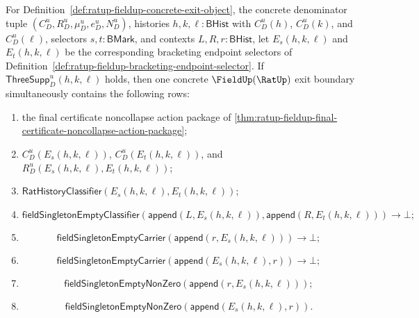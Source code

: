 \begin{theorem}
\label{thm:ratup-fieldup-final-certificate-selector-noncollapse-boundary}
For Definition~\ref{def:ratup-fieldup-concrete-exit-object}, the concrete
denominator tuple $(C_D^u,R_D^u,\mu_D^u,e_D^u,N_D^u)$, histories
$h,k,\ell:\mathsf{BHist}$ with $C_D^u(h)$, $C_D^u(k)$, and $C_D^u(\ell)$,
selectors $s,t:\mathsf{BMark}$, and contexts $L,R,r:\mathsf{BHist}$, let
$E_s(h,k,\ell)$ and $E_t(h,k,\ell)$ be the corresponding bracketing endpoint
selectors of Definition~\ref{def:ratup-fieldup-bracketing-endpoint-selector}. If
$\mathsf{ThreeSupp}_D^u(h,k,\ell)$ holds, then one concrete
$\FieldUp(\RatUp)$ exit boundary simultaneously contains the following rows:
\begin{enumerate}
  \item the final certificate noncollapse action package of
  \autoref{thm:ratup-fieldup-final-certificate-noncollapse-action-package};
  \item $C_D^u(E_s(h,k,\ell))$, $C_D^u(E_t(h,k,\ell))$, and
  $R_D^u(E_s(h,k,\ell),E_t(h,k,\ell))$;
  \item $\mathsf{RatHistoryClassifier}(E_s(h,k,\ell),E_t(h,k,\ell))$;
  \item
  $$
  \mathsf{fieldSingletonEmptyClassifier}
  (\mathsf{append}(L,E_s(h,k,\ell)),\mathsf{append}(R,E_t(h,k,\ell)))\to\bot;
  $$
  \item
  $$
  \mathsf{fieldSingletonEmptyCarrier}(\mathsf{append}(r,E_s(h,k,\ell)))\to\bot;
  $$
  \item
  $$
  \mathsf{fieldSingletonEmptyCarrier}(\mathsf{append}(E_s(h,k,\ell),r))\to\bot;
  $$
  \item
  $$
  \mathsf{fieldSingletonEmptyNonZero}(\mathsf{append}(r,E_s(h,k,\ell)));
  $$
  \item
  $$
  \mathsf{fieldSingletonEmptyNonZero}(\mathsf{append}(E_s(h,k,\ell),r)).
  $$
\end{enumerate}
\end{theorem}

